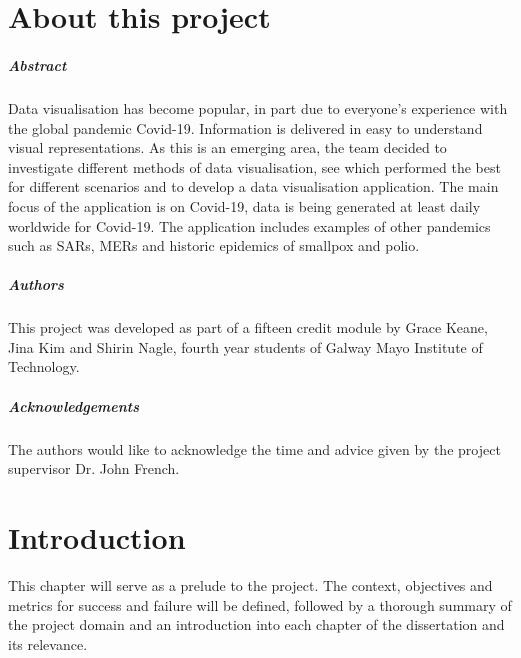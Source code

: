 
\chapter*{About this project}
\paragraph{Abstract}
Data visualisation has become popular, in part due to everyone's experience with the global pandemic Covid-19. Information is delivered in easy to understand visual representations. As this is an emerging area, the team decided to investigate different methods of data visualisation, see which performed the best for different scenarios and to develop a data visualisation application. The main focus of the application is on Covid-19, data is being generated at least daily worldwide for Covid-19. The application includes examples of other pandemics such as SARs, MERs and historic epidemics of smallpox and polio.

\paragraph{Authors}
This project was developed as part of a fifteen credit module by Grace Keane, Jina Kim and Shirin Nagle, fourth year students of Galway Mayo Institute of Technology.

\paragraph{Acknowledgements} The authors would like to acknowledge the time and advice given by the project supervisor Dr. John French.

\chapter{Introduction}
This chapter will serve as a prelude to the project. The context, objectives and metrics for success and failure will be defined, followed by a thorough summary of the project domain and an introduction into each chapter of the dissertation and its relevance.

